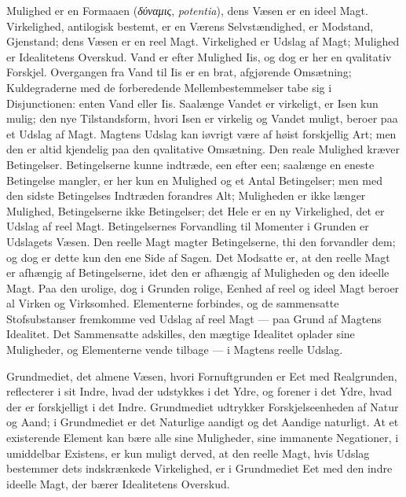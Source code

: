 \documentclass[12pt,a4paper]{book}
\begin{document}
Mulighed er en Formaaen (\textit{δύναμις}, \textit{potentia}), dens Væsen
er en ideel Magt. Virkelighed, antilogisk bestemt, er en Værens
Selvstændighed, er Modstand, Gjenstand; dens Væsen er en reel Magt.
Virkelighed er Udslag af Magt; Mulighed er Idealitetens Overskud. Vand er
efter Mulighed Iis, og dog er her en qvalitativ Forskjel. Overgangen fra
Vand til Iis er en brat, afgjørende Omsætning; Kuldegraderne med de
forberedende Mellembestemmelser tabe sig i Disjunctionen: enten Vand eller
Iis. Saalænge Vandet er virkeligt, er Isen kun mulig; den nye
Tilstandsform, hvori Isen er virkelig og Vandet muligt, beroer paa et
Udslag af Magt. Magtens Udslag kan iøvrigt være af høist forskjellig Art;
men den er altid kjendelig paa den qvalitative Omsætning. Den reale
Mulighed kræver Betingelser. Betingelserne kunne indtræde, een efter een;
saalænge en eneste Betingelse mangler, er her kun en Mulighed og et Antal
Betingelser; men med den sidste Betingelses Indtræden forandres Alt;
Muligheden er ikke længer Mulighed, Betingelserne ikke Betingelser; det
Hele er en ny Virkelighed, det er Udslag af reel Magt. Betingelsernes
Forvandling til Momenter i Grunden er Udslagets Væsen. Den reelle Magt
magter Betingelserne, thi den forvandler dem; og dog er dette kun den ene
Side af Sagen. Det Modsatte er, at den reelle Magt er afhængig af
Betingelserne, idet den er afhængig af Muligheden og den ideelle Magt. Paa
den urolige, dog i Grunden rolige, Eenhed af reel og ideel Magt beroer al
Virken og Virksomhed. Elementerne forbindes, og de sammensatte
Stofsubstanser fremkomme ved Udslag af reel Magt --- paa Grund af Magtens
Idealitet. Det Sammensatte adskilles, den mægtige Idealitet oplader sine
Muligheder, og Elementerne vende tilbage --- i Magtens reelle Udslag.


Grundmediet, det almene Væsen, hvori Fornuftgrunden er Eet med
Realgrunden, reflecterer i sit Indre, hvad der udstykkes i det Ydre, og
forener i det Ydre, hvad der er forskjelligt i det Indre. Grundmediet
udtrykker Forskjelseenheden af Natur og Aand; i Grundmediet er det
Naturlige aandigt og det Aandige naturligt. At et existerende Element
kan bære alle sine Muligheder, sine immanente Negationer, i umiddelbar
Existens, er kun muligt derved, at den reelle Magt, hvis Udslag
bestemmer dets indskrænkede Virkelighed, er i Grundmediet Eet med den
indre ideelle Magt, der bærer Idealitetens Overskud.
\end{document}

